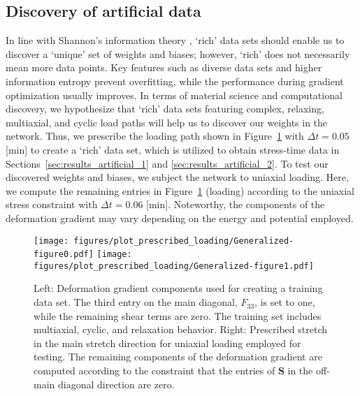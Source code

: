 \subsection{Discovery of artificial data}
\label{sec:results_artificial}
%
In line with Shannon's information theory \cite{shannon1948}, `rich' data sets should enable us to discover a `unique' set of weights and biases; however, `rich' does not necessarily mean more data points.
Key features such as diverse data sets and higher information entropy prevent overfitting, while the performance during gradient optimization usually improves.
In terms of material science and computational discovery, we hypothesize that `rich' data sets featuring complex, relaxing, multiaxial, and cyclic load paths will help us to discover our weights in the network.
Thus, we prescribe the loading path shown in Figure~\ref{fig:loading} with $\Delta t = 0.05$ [min] to create a `rich' data set, which is utilized to obtain stress-time data in Sections~\ref{sec:results_artificial_1} and \ref{sec:results_artificial_2}.
To test our discovered weights and biases, we subject the network to uniaxial loading.
Here, we compute the remaining entries in Figure~\ref{fig:loading} (loading) according to the uniaxial stress constraint with $\Delta t = 0.06$ [min].
Noteworthy, the components of the deformation gradient may vary depending on the energy and potential employed.
%
\begin{figure}[h]
    \centering
    \texttt{[image: figures/plot\_prescribed\_loading/Generalized-figure0.pdf]}
    \texttt{[image: figures/plot\_prescribed\_loading/Generalized-figure1.pdf]}
    \caption{Left: Deformation gradient components used for creating a training data set. The third entry on the main diagonal, $F_{33}$, is set to one, while the remaining shear terms are zero. The training set includes multiaxial, cyclic, and relaxation behavior. Right: Prescribed stretch in the main stretch direction for uniaxial loading employed for testing. The remaining components of the deformation gradient are computed according to the constraint that the entries of $\bm{S}$ in the off-main diagonal direction are zero.}
    \label{fig:loading}
\end{figure}
%
